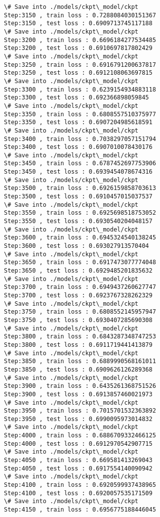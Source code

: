 \documentclass[11pt]{article}
\begin{document}
\begin{Verbatim}[commandchars=\\\{\}]
\# Save into ./models/ckpt\_model/ckpt
Step:3150 , train loss : 0.7288084030151367
Step:3150 , test loss : 0.6909713745117188
\# Save into ./models/ckpt\_model/ckpt
Step:3200 , train loss : 0.6696184277534485
Step:3200 , test loss : 0.6910697817802429
\# Save into ./models/ckpt\_model/ckpt
Step:3250 , train loss : 0.6916791200637817
Step:3250 , test loss : 0.6912108063697815
\# Save into ./models/ckpt\_model/ckpt
Step:3300 , train loss : 0.6239154934883118
Step:3300 , test loss : 0.692366898059845
\# Save into ./models/ckpt\_model/ckpt
Step:3350 , train loss : 0.6808557510375977
Step:3350 , test loss : 0.6907204985618591
\# Save into ./models/ckpt\_model/ckpt
Step:3400 , train loss : 0.7038297057151794
Step:3400 , test loss : 0.6907010078430176
\# Save into ./models/ckpt\_model/ckpt
Step:3450 , train loss : 0.6787452697753906
Step:3450 , test loss : 0.6939454078674316
\# Save into ./models/ckpt\_model/ckpt
Step:3500 , train loss : 0.6926159858703613
Step:3500 , test loss : 0.6910457015037537
\# Save into ./models/ckpt\_model/ckpt
Step:3550 , train loss : 0.6925698518753052
Step:3550 , test loss : 0.6930540204048157
\# Save into ./models/ckpt\_model/ckpt
Step:3600 , train loss : 0.6945324540138245
Step:3600 , test loss : 0.693027913570404
\# Save into ./models/ckpt\_model/ckpt
Step:3650 , train loss : 0.6917473077774048
Step:3650 , test loss : 0.6929485201835632
\# Save into ./models/ckpt\_model/ckpt
Step:3700 , train loss : 0.6949437260627747
Step:3700 , test loss : 0.6923767328262329
\# Save into ./models/ckpt\_model/ckpt
Step:3750 , train loss : 0.6808552145957947
Step:3750 , test loss : 0.6930407285690308
\# Save into ./models/ckpt\_model/ckpt
Step:3800 , train loss : 0.6843287348747253
Step:3800 , test loss : 0.6911719441413879
\# Save into ./models/ckpt\_model/ckpt
Step:3850 , train loss : 0.6889990568161011
Step:3850 , test loss : 0.6909626126289368
\# Save into ./models/ckpt\_model/ckpt
Step:3900 , train loss : 0.6435261368751526
Step:3900 , test loss : 0.6913857460021973
\# Save into ./models/ckpt\_model/ckpt
Step:3950 , train loss : 0.7015701532363892
Step:3950 , test loss : 0.6990095973014832
\# Save into ./models/ckpt\_model/ckpt
Step:4000 , train loss : 0.6886709332466125
Step:4000 , test loss : 0.6912970542907715
\# Save into ./models/ckpt\_model/ckpt
Step:4050 , train loss : 0.669581413269043
Step:4050 , test loss : 0.6917554140090942
\# Save into ./models/ckpt\_model/ckpt
Step:4100 , train loss : 0.6920599937438965
Step:4100 , test loss : 0.6920057535171509
\# Save into ./models/ckpt\_model/ckpt
Step:4150 , train loss : 0.6956775188446045

\end{Verbatim}
\end{document}
